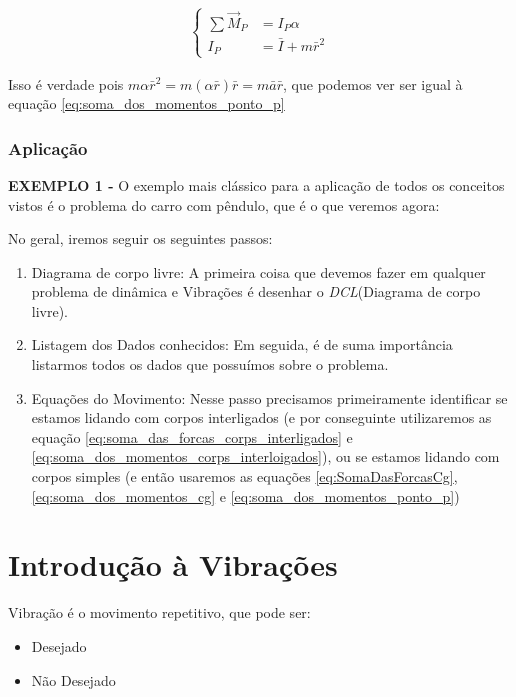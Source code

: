\documentclass{article}
\begin{document}
                \begin{align}
                    \begin{cases}
                        \sum \vec{M}_P &= I_P \alpha \\ 
                        I_P &= \bar I + m \bar r^2
                    \end{cases}
            \end{align}

            Isso é verdade pois $m \alpha \bar r^2 = m (\alpha \bar r) \bar r = m \bar a \bar r $, que podemos ver ser igual à equação \ref{eq:soma_dos_momentos_ponto_p}

        \subsubsection[Aplicação]{Aplicação}

            \textbf{EXEMPLO 1 - } O exemplo mais clássico para a aplicação de todos os conceitos vistos é o problema do carro com pêndulo, que é o que veremos agora:


            No geral, iremos seguir os seguintes passos:
            \begin{enumerate}
                \item Diagrama de corpo livre: A primeira coisa que devemos fazer em qualquer problema de dinâmica e Vibrações é desenhar o \emph{DCL}(Diagrama de corpo livre).
                \item Listagem dos Dados conhecidos: Em seguida, é de suma importância listarmos todos os dados que possuímos sobre o problema.
                \item Equações do Movimento: Nesse passo precisamos primeiramente identificar se estamos lidando com corpos interligados (e por conseguinte utilizaremos as equação 
                \ref{eq:soma_das_forcas_corps_interligados} e \ref{eq:soma_dos_momentos_corps_interloigados}), ou se estamos lidando com corpos simples (e então usaremos as equações 
                \ref{eq:SomaDasForcasCg}, \ref{eq:soma_dos_momentos_cg} e \ref{eq:soma_dos_momentos_ponto_p})
            \end{enumerate}



    \section{Introdução à Vibrações}

            Vibração é o movimento repetitivo, que pode ser:
            \begin{itemize}
                \item Desejado
                \item Não Desejado
            \end{itemize}
\end{document}
